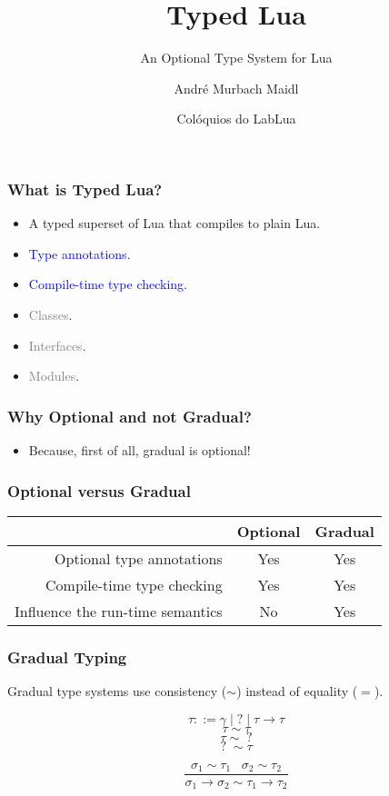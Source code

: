 \documentclass{beamer}
\begin{document}
\title{Typed Lua}
\subtitle{An Optional Type System for Lua}
\author{André Murbach Maidl}
\date{Colóquios do LabLua}

\frame{\titlepage}

\begin{frame}
\frametitle{What is Typed Lua?}
\begin{itemize}
\item A typed superset of Lua that compiles to plain Lua.
\item \textcolor{blue}{Type annotations}.
\item \textcolor{blue}{Compile-time type checking}.
\item \textcolor{gray}{Classes}.
\item \textcolor{gray}{Interfaces}.
\item \textcolor{gray}{Modules}.
\end{itemize}
\end{frame}

\begin{frame}
\frametitle{Why Optional and not Gradual?}
\begin{itemize}
\item Because, first of all, gradual is optional!
\end{itemize}
\end{frame}

\begin{frame}
\frametitle{Optional versus Gradual}
\begin{center}
\begin{tabular}{|r|c|c|}
\hline
& Optional & Gradual\\
\hline
Optional type annotations & Yes & Yes \\ 
\hline
Compile-time type checking & Yes & Yes \\
\hline
Influence the run-time semantics & No & Yes \\
\hline
\end{tabular}
\end{center}
\end{frame}

\begin{frame}
\frametitle{Gradual Typing}
Gradual type systems use consistency ($\sim$) instead of equality ($=$).
\begin{Large}
\[
\tau ::= \gamma \;|\; ? \;|\; \tau \rightarrow \tau
\]
\[
\tau \sim \tau
\]
\[
\tau \sim \;?
\]
\[
?\; \sim \tau
\]

\[
\frac{\sigma_{1} \sim \tau_{1} \;\;\; \sigma_{2} \sim \tau_{2}}
     {\sigma_{1} \rightarrow \sigma_{2} \sim \tau_{1} \rightarrow \tau_{2}}
\]
\end{Large}
\end{frame}
\end{document}
